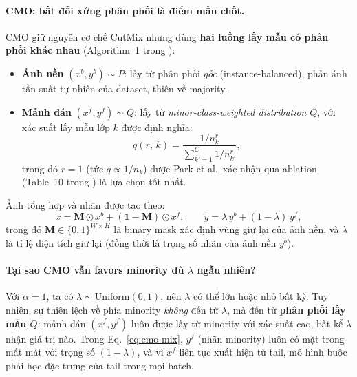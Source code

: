 \paragraph{CMO: bất đối xứng phân phối là điểm mấu chốt.}
CMO \cite{park2022cmo} giữ nguyên cơ chế CutMix nhưng dùng
\textbf{hai luồng lấy mẫu có phân phối khác nhau}
(Algorithm~1 trong \cite{park2022cmo}):
\begin{itemize}
    \item \textbf{Ảnh nền} $(x^b, y^b) \sim P$:
    lấy từ phân phối \emph{gốc} (instance-balanced),
    phản ánh tần suất tự nhiên của dataset, thiên về majority.

    \item \textbf{Mảnh dán} $(x^f, y^f) \sim Q$:
    lấy từ \emph{minor-class-weighted distribution} $Q$,
    với xác suất lấy mẫu lớp $k$ được định nghĩa:
    \begin{equation}
        q(r,\,k)
        = \frac{1/n_k^r}{\displaystyle\sum_{k'=1}^{C} 1/n_{k'}^r},
        \label{eq:cmo-q}
    \end{equation}
    trong đó $r=1$ (tức $q \propto 1/n_k$) được Park et al.\
    xác nhận qua ablation (Table~10 trong \cite{park2022cmo})
    là lựa chọn tốt nhất.
\end{itemize}


Ảnh tổng hợp và nhãn được tạo theo:
\begin{equation}
    \tilde{x} = \mathbf{M} \odot x^b + (\mathbf{1} - \mathbf{M}) \odot x^f,
    \qquad
    \tilde{y} = \lambda\, y^b + (1-\lambda)\, y^f,
    \label{eq:cmo-mix}
\end{equation}
trong đó $\mathbf{M} \in \{0,1\}^{W \times H}$ là binary mask xác định
vùng giữ lại của ảnh nền, và $\lambda$ là tỉ lệ diện tích giữ lại
(đồng thời là trọng số nhãn của ảnh nền $y^b$).

\paragraph{Tại sao CMO vẫn favors minority dù $\lambda$ ngẫu nhiên?}
Với $\alpha = 1$, ta có $\lambda \sim \mathrm{Uniform}(0,1)$,
nên $\lambda$ có thể lớn hoặc nhỏ bất kỳ.
Tuy nhiên, sự thiên lệch về phía minority \emph{không} đến từ $\lambda$,
mà đến từ \textbf{phân phối lấy mẫu $Q$}:
mảnh dán $(x^f, y^f)$ luôn được lấy từ minority với xác suất cao,
bất kể $\lambda$ nhận giá trị nào.
Trong Eq.~\eqref{eq:cmo-mix}, $y^f$ (nhãn minority) luôn có mặt
trong mất mát với trọng số $(1-\lambda)$, và vì $x^f$ liên tục xuất hiện
từ tail, mô hình buộc phải học đặc trưng của tail trong mọi batch.

